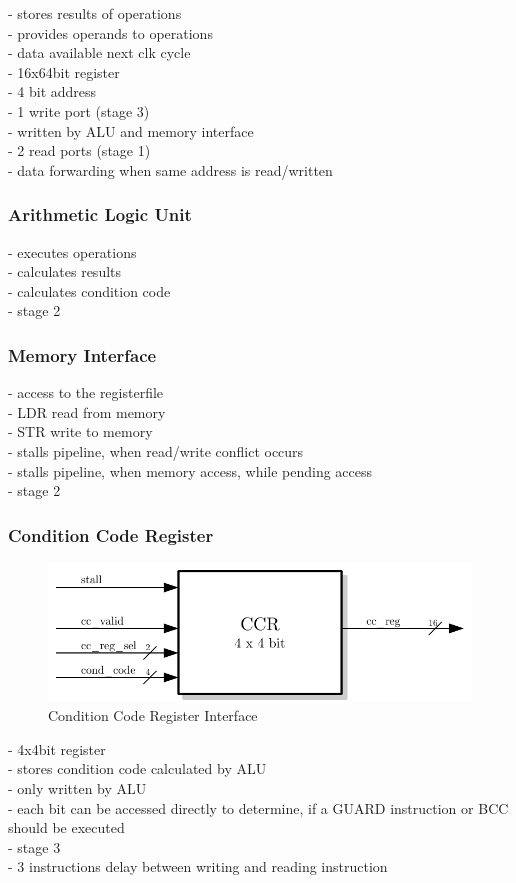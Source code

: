 - stores results of operations\\
- provides operands to operations\\
- data available next clk cycle\\
- 16x64bit register\\
- 4 bit address\\
- 1 write port (stage 3)\\
- written by ALU and memory interface\\
- 2 read ports (stage 1)\\
- data forwarding when same address is read/written\\


\subsubsection{Arithmetic Logic Unit}

- executes operations\\
- calculates results\\
- calculates condition code\\
- stage 2\\

\subsubsection{Memory Interface}

- access to the registerfile\\
- LDR read from memory\\
- STR write to memory\\
- stalls pipeline, when read/write conflict occurs\\
- stalls pipeline, when memory access, while pending access\\
- stage 2\\

\subsubsection{Condition Code Register}

\begin{figure}[htb]
 \centering
 \includegraphics[scale=1.0]{images/ccr_blackbox}
 \caption{Condition Code Register Interface}
\label{fig:ccr_inf}
\end{figure}

- 4x4bit register\\
- stores condition code calculated by ALU\\
- only written by ALU\\
- each bit can be accessed directly to determine, if a GUARD instruction or BCC should be executed\\
- stage 3\\
- 3 instructions delay between writing and reading instruction\\




